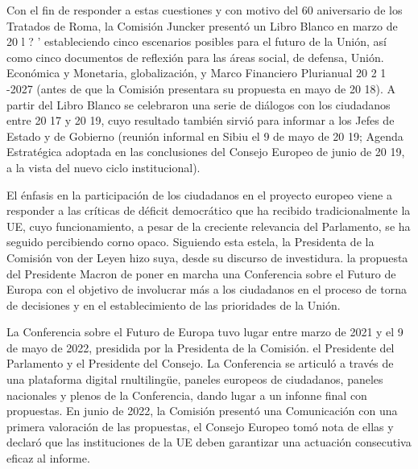 \documentclass[10pt,a4paper]{article}
\begin{document}
Con el fin de responder a estas cuestiones y con motivo del 60 aniversario de los Tratados de Roma, la Comisión Juncker presentó un Libro Blanco en marzo de 20 l ? ' estableciendo cinco escenarios posibles para el futuro de la Unión, así como cinco documentos de reflexión para las áreas social, de defensa, Unión. Económica y Monetaria, globalización, y Marco Financiero Plurianual 20 2 1 -2027 (antes de que la Comisión presentara su propuesta en mayo de 20 18). A partir del Libro Blanco se celebraron una serie de diálogos con los ciudadanos entre 20 17 y 20 19, cuyo resultado también sirvió para informar a los Jefes de Estado y de Gobierno (reunión informal en Sibiu el 9 de mayo de 20 19; Agenda Estratégica adoptada en las conclusiones del Consejo Europeo de junio de 20 19, a la vista del nuevo ciclo institucional).

El énfasis en la participación de los ciudadanos en el proyecto europeo viene a responder a las críticas de déficit democrático que ha recibido tradicionalmente la UE, cuyo funcionamiento, a pesar de la creciente relevancia del Parlamento, se ha seguido percibiendo corno opaco. Siguiendo esta estela, la Presidenta de la Comisión von der Leyen hizo suya, desde su discurso de investidura. la propuesta del Presidente Macron de poner en marcha una Conferencia sobre el Futuro de Europa con el objetivo de involucrar más a los ciudadanos en el proceso de torna de decisiones y en el establecimiento de las prioridades de la Unión.

La Conferencia sobre el Futuro de Europa tuvo lugar entre marzo de 2021 y el 9 de mayo de 2022, presidida por la Presidenta de la Comisión. el Presidente del Parlamento y el Presidente del Consejo. La Conferencia se articuló a través de una plataforma digital rnultilingüe, paneles europeos de ciudadanos, paneles nacionales y plenos de la Conferencia, dando lugar a un infonne final con propuestas. En junio de 2022, la Comisión presentó una Comunicación con una primera valoración de las propuestas, el Consejo Europeo tomó nota de ellas y declaró que las instituciones de la UE deben garantizar una actuación consecutiva eficaz al informe.
\end{document}
